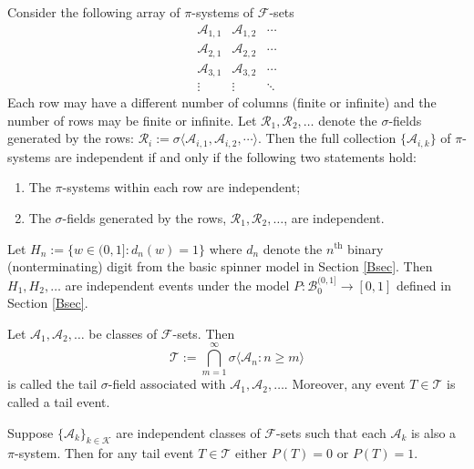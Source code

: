\begin{theorem}[{\bf ANOVA${}^*$}]
Consider the following array of $\pi$-systems of $\mathcal F$-sets
\[
\begin{array}{ccc}
\mathscr A_{1,1} & \mathscr A_{1,2} & \cdots \\
\mathscr A_{2,1} & \mathscr A_{2,2} & \cdots \\
\mathscr A_{3,1} & \mathscr A_{3,2} & \cdots \\
\vdots & \vdots & \ddots
\end{array}
\]
Each row may have a different number of columns (finite or infinite) and the number of rows may be finite or infinite.
Let $\mathscr R_1,\mathscr R_2,\ldots$ denote the $\sigma$-fields generated by the rows: $\mathscr R_i:=\sigma\langle \mathscr A_{i,1}, \mathscr A_{i,2} , \cdots \rangle $.
 Then the full collection  $\{ \mathscr A_{i,k} \}$ of $\pi$-systems are independent  if and only if the following two statements hold:
\begin{enumerate}
\item The $\pi$-systems within each row are independent;
\item The  $\sigma$-fields generated by the rows, $\mathscr R_1,\mathscr R_2,\ldots$, are independent.
\end{enumerate}
\end{theorem}



\begin{theorem}\label{ibd}
Let $H_n:=\{w\in(0,1]: d_n(w)=1  \}$ where $d_n$ denote the $n^\text{th}$ binary (nonterminating) digit from the basic spinner model in Section \ref{Bsec}. Then $H_1, H_2, \ldots$ are independent events under the model $P:\mathcal B_0^{(0,1]}\rightarrow [0,1]$ defined in Section \ref{Bsec}.
\end{theorem}

\begin{definition}
Let $\mathscr A_1, \mathscr A_2, \ldots$ be classes of $\mathcal F$-sets. Then
\[ \mathcal T :=\bigcap_{m=1}^\infty \sigma\langle \mathscr A_n: n\geq m\rangle \]
is called the {tail $\sigma$-field associated with $\mathscr A_1, \mathscr A_2, \ldots$}. Moreover, any event $T\in \mathcal T$ is called a {tail event}.
\end{definition}

\begin{theorem}
Suppose $\{\mathscr A_k\}_{k\in\mathcal K}$ are independent classes of  $\mathcal F$-sets such that each $\mathscr A_k$ is also a $\pi$-system. Then for any tail event $T\in\mathcal T$ either $P(T)=0$ or $P(T)=1$.
\end{theorem}

